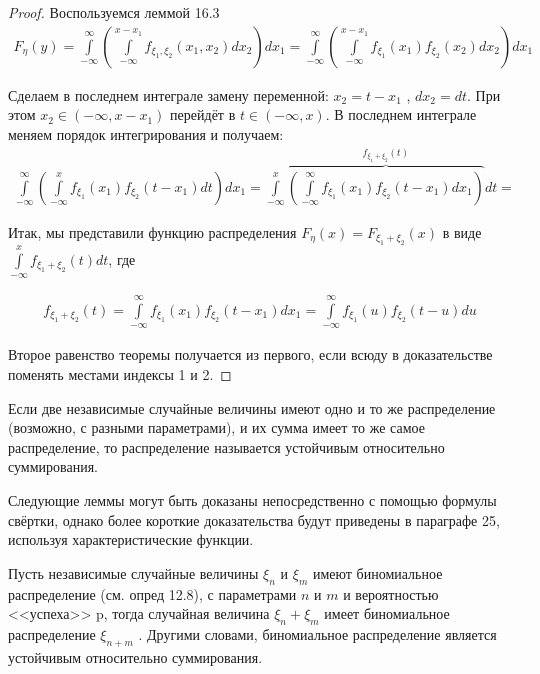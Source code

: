 \begin{proof}
Воспользуемся леммой 16.3
\begin{gather*}
	F_\eta (y) =
	\int\limits_{-\infty}^{\infty}\left(
		\int\limits_{-\infty}^{x-x_1 } f_{\xi_1,\xi_2} (x_1 , x_2 ) dx_2
	\right)dx_1=
	\int\limits_{-\infty}^{\infty}\left(
		\int\limits_{-\infty}^{x-x_1 } f_{\xi_1}(x_1)f_{\xi_2}(x_2) dx_2
	\right)dx_1
\end{gather*}

Сделаем в последнем интеграле замену переменной: $x_2 = t - x_1$ , $dx_2 = dt$.
При этом $x_2 \in (-\infty, x - x_1 )$ перейдёт в $t \in (-\infty, x)$. В последнем интеграле меняем порядок интегрирования и получаем:
\begin{gather*}
	\int\limits_{-\infty}^{\infty}\left(
		\int\limits_{-\infty}^{x} f_{\xi_1}(x_1)f_{\xi_2}(t-x_1) dt
	\right)dx_1=
	\int\limits_{-\infty}^{x}\overbrace{\left(
		\int\limits_{-\infty}^{\infty} f_{\xi_1}(x_1)f_{\xi_2}(t-x_1) dx_1
	\right)}^{f_{\xi_1+\xi_2}(t)}dt=
\end{gather*}

Итак, мы представили функцию распределения $F_\eta (x) = F_{\xi_1 +\xi_2} (x)$ в виде $\int\limits_{-\infty}^{x} f_{\xi_1 +\xi_2} (t) dt$, где

\begin{gather*}
	f_{\xi_1 +\xi_2} (t)=\int\limits_{-\infty}^{\infty} f_{\xi_1}(x_1)f_{\xi_2}(t-x_1) dx_1=\int\limits_{-\infty}^{\infty} f_{\xi_1}(u)f_{\xi_2}(t-u) du
\end{gather*}

Второе равенство теоремы получается из первого, если всюду в доказательстве поменять местами индексы 1 и 2.
\end{proof}

\begin{definition}
\label{def:16.7}
Если две независимые случайные величины имеют одно и то же распределение (возможно, с разными параметрами), и их сумма имеет то же самое распределение, то распределение называется устойчивым относительно суммирования.
\end{definition}

\begin{zam}
\label{zam:16.8}
Следующие леммы могут быть доказаны непосредственно с помощью формулы свёртки, однако более короткие доказательства будут приведены в параграфе 25, используя характеристические функции.
\end{zam}

\begin{lemma}
\label{lemma:16.9}
	Пусть независимые случайные величины $\xi_n$ и $\xi_m$ имеют
биномиальное распределение (см. опред 12.8), с параметрами $n$ и $m$ и вероятностью <<успеха>>  p, тогда случайная величина $\xi_n + \xi_m$ имеет биномиальное распределение $\xi_{n+m}$ . Другими словами, биномиальное распределение является устойчивым относительно суммирования.
\end{lemma}

